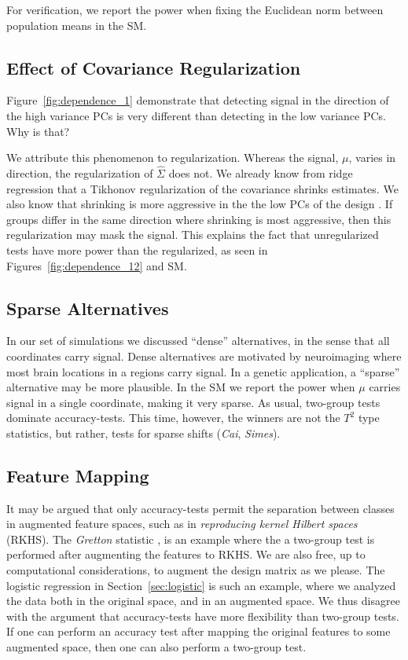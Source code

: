 \documentclass[]{bio}
\begin{document}
For verification, we report the power when fixing the Euclidean norm between population means in the SM.



\subsection{Effect of Covariance Regularization}
\label{sec:regularizaton}

Figure~\ref{fig:dependence_1} demonstrate that detecting signal in the direction of the high variance PCs is very different than detecting in the low variance PCs.
Why is that?

We attribute this phenomenon to regularization.
Whereas the signal, $\mu$, varies in direction, the regularization of $\hat \Sigma$ does not. 
We already know from ridge regression that a Tikhonov regularization of the covariance shrinks estimates. 
We also know that shrinking is more aggressive in the the low PCs of the design \cite{hastie_elements_2003}. 
If groups differ in the same direction where shrinking is most aggressive, then this regularization may mask the signal. 
This explains the fact that unregularized tests have more power than the regularized, as seen in Figures~\ref{fig:dependence_12} and SM.


\subsection{Sparse Alternatives}
\label{sec:sparse}
In our set of simulations we discussed ``dense'' alternatives, in the sense that all coordinates carry signal.
Dense alternatives are motivated by neuroimaging where most brain locations in a regions carry signal.
In a genetic application, a ``sparse'' alternative may be more plausible. 
In the SM we report the power when $\mu$ carries signal in a single coordinate, making it very sparse. 
As usual, two-group tests dominate accuracy-tests.
This time, however, the winners are not the $T^2$ type statistics, but rather, tests for sparse shifts (\emph{Cai}, \emph{Simes}).





\subsection{Feature Mapping}
It may be argued that only accuracy-tests permit the separation between classes in augmented feature spaces, such as in \emph{reproducing kernel Hilbert spaces} (RKHS).
The \emph{Gretton} statistic \cite{gretton_kernel_2012-1}, is an example where the a two-group test is performed after augmenting the features to RKHS.
We are also free, up to computational considerations, to augment the design matrix as we please. 
The logistic regression in Section~\ref{sec:logistic} is such an example, where we analyzed the data both in the original space, and in an augmented space. 
We thus disagree with the argument that accuracy-tests have more flexibility than two-group tests. 
If one can perform an accuracy test after mapping the original features to some augmented space, then one can also perform a two-group test. 
\end{document}
